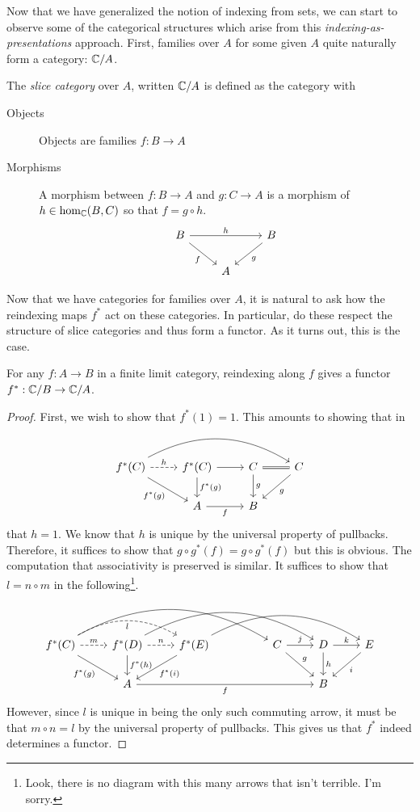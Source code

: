 Now that we have generalized the notion of indexing from sets, we can
start to observe some of the categorical structures which arise from
this \emph{indexing-as-presentations} approach. First, families over
$A$ for some given $A$ quite naturally form a category: $\mathbb{C}/A$.
\begin{defn}\label{defn:fibrations:slicecat}
  The \emph{slice category} over $A$, written $\mathbb{C}/A$ is defined as
  the category with
  \begin{description}
  \item[Objects] Objects are families $f : B \to A$
  \item[Morphisms] A morphism between $f : B \to A$ and $g : C \to A$ is
    a morphism of $h \in \hom_{\mathbb{C}}(B, C)$ so that $f = g \circ h$.
    \[
      \begin{tikzcd}
        B \ar[rr, "h"] \ar[dr, swap, "f"] & & B \ar[dl, "g"]\\
        & A &
      \end{tikzcd}
    \]
  \end{description}
\end{defn}
Now that we have categories for families over $A$, it is natural to
ask how the reindexing maps $f^*$ act on these categories. In
particular, do these respect the structure of slice categories and
thus form a functor. As it turns out, this is the case.
\begin{thm}\label{thm:fibrations:pullbackfunctor}
  For any $f : A \to B$ in a finite limit category, reindexing along
  $f$ gives a functor $f^* : \mathbb{C}/B \to \mathbb{C}/A$.
\end{thm}
\begin{proof}
  First, we wish to show that $f^*(1) = 1$. This amounts to showing
  that in
  \[
    \begin{tikzcd}
      f^*(C) \ar[r, dashed, "h"] \ar[dr, swap, "f^*(g)"] \ar[rrr, bend left]
      & f^*(C) \ar[d, "f^*(g)"] \ar[r] &
      C \ar[d, "g"] \ar[r, equal] & C \ar[dl, "g"]\\
      & A \ar[r, "f", swap] & B &
    \end{tikzcd}
  \]
  that $h = 1$. We know that $h$ is unique by the universal property
  of pullbacks. Therefore, it suffices to show that
  $g \circ g^*(f) = g \circ g^*(f)$ but this is obvious. The
  computation that associativity is preserved is similar. It suffices
  to show that $l = n \circ m$ in the following\footnote{Look, there
    is no diagram with this many arrows that isn't terrible. I'm sorry.}.
  \[
    \begin{tikzcd}
      f^*(C) \ar[dr, "f^*(g)", swap] \ar[rrrr, bend left]
      \ar[rr, bend left, "l", swap, dashed] \ar[r, dashed, "m"]&
      f^*(D) \ar[d, "f^*(h)"] \ar[rrrr, bend left] \ar[r, dashed, "n"]&
      f^*(E) \ar[dl, "f^*(i)"] \ar[rrrr, bend left]
      &&C \ar[dr, "g"]\ar[r, "j"] & D \ar[d, "h"] \ar[r, "k"] & E \ar[dl, "i"]\\
      &A \ar[rrrr, "f", swap]& &&&B&
    \end{tikzcd}
  \]
  However, since $l$ is unique in being the only such commuting arrow,
  it must be that $m \circ n = l$ by the universal property of
  pullbacks. This gives us that $f^*$ indeed determines a functor.
\end{proof}

